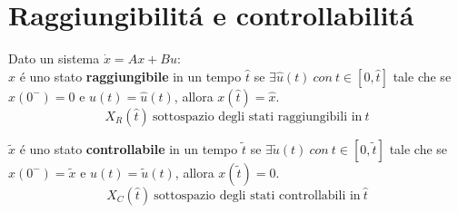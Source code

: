 \documentclass[../main.tex]{subfiles}
\begin{document}
	\makeatletter
	\newcommand{\setword}[2]{%
		\phantomsection
		#1\def\@currentlabel{\unexpanded{#1}}\label{#2}%
	}
	\makeatother
	
	\section{Raggiungibilit\'a e controllabilit\'a}
		Dato un sistema $ \dot x = A x + B u $:\\
		
		$ \hat x $ \'e uno stato \textbf{raggiungibile} in un tempo $ \hat t $ se $ \exists \hat u(t)\ con\ t \in [0, \hat t] $ tale che se $ x(0^-) = 0 $ e $ u(t) = \hat u(t) $, allora $ x(\hat t) = \hat x $.
		\[ X_R(\hat t)\ \text{sottospazio degli stati raggiungibili in}\ \hat t \]
		
		$ \tilde x $ \'e uno stato \textbf{controllabile} in un tempo $ \tilde t $ se $ \exists \tilde u(t)\ con\ t \in [0, \tilde t] $ tale che se $ x(0^-) = \tilde x $ e $ u(t) = \tilde u(t) $, allora $ x(\tilde t) = 0 $.
		\[ X_C(\hat t)\ \text{sottospazio degli stati controllabili in}\ \hat t \]
		
\end{document}
